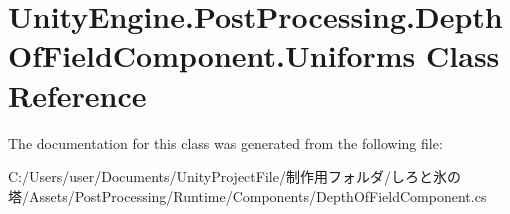 \hypertarget{class_unity_engine_1_1_post_processing_1_1_depth_of_field_component_1_1_uniforms}{}\section{Unity\+Engine.\+Post\+Processing.\+Depth\+Of\+Field\+Component.\+Uniforms Class Reference}
\label{class_unity_engine_1_1_post_processing_1_1_depth_of_field_component_1_1_uniforms}


The documentation for this class was generated from the following file\+:\begin{DoxyCompactItemize}
\item 
C\+:/\+Users/user/\+Documents/\+Unity\+Project\+File/制作用フォルダ/しろと氷の塔/\+Assets/\+Post\+Processing/\+Runtime/\+Components/Depth\+Of\+Field\+Component.\+cs\end{DoxyCompactItemize}
